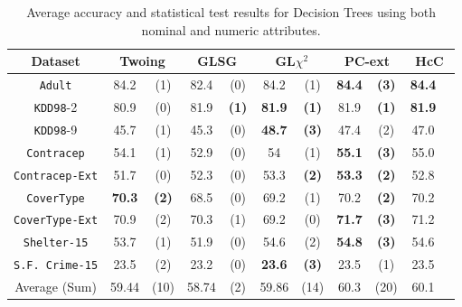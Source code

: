 \begin{table}
\small
\centering
\begin{tabular}{c|cc|cc|cc|cc|cc} 
Dataset            &\multicolumn{2}{c|}{Twoing} & \multicolumn{2}{c|}{GLSG} & \multicolumn{2}{c|}{GL$\chi^2$} & \multicolumn{2}{c|}{PC-ext}& \multicolumn{2}{c}{HcC}\\  \hline   
{\tt Adult}        & 84.2           & (1)       & 82.4       & (0)          &  84.2       & (1)               & {\bf 84.4 } & {\bf (3) }  & {\bf 84.4 } &           \\
{\tt KDD98}-2      & 80.9           & (0)       & 81.9       & {\bf (1)}    & {\bf 81.9 } & {\bf (1) }        & 81.9        & {\bf (1) }  & {\bf 81.9 } &           \\ 
{\tt KDD98}-9      & 45.7           & (1)       & 45.3       &  (0)         & {\bf 48.7 } & {\bf (3) }        &  47.4       & (2)         & 47.0        &           \\ 
{\tt Contracep}    & 54.1           & (1)       & 52.9       &  (0)         & 54          & (1)               & {\bf 55.1 } & {\bf (3) }  & 55.0        &           \\  
{\tt Contracep-Ext}& 51.7           & (0)       & 52.3       &  (0)         & 53.3        & {\bf (2) }        & {\bf 53.3 } & {\bf (2) }  & 52.8        &           \\ 
{\tt CoverType}    &  {\bf 70.3 }   & {\bf (2)} & 68.5       &  (0)         & 69.2        & (1)               &  70.2       & {\bf (2) }  & 70.2        &           \\  
{\tt CoverType-Ext}& 70.9           & (2)       & 70.3       &  (1)         & 69.2        & (0)               & {\bf 71.7 } & {\bf (3) }  & 71.2        &           \\ 
{\tt Shelter-15}   & 53.7           & (1)       & 51.9       &  (0)         & 54.6        & (2)               & {\bf 54.8 } & {\bf (3) }  & 54.6        &           \\   
{\tt S.F. Crime-15}& 23.5           & (2)       & 23.2       &  (0)         & {\bf 23.6 } & {\bf (3) }        & 23.5        & (1)         & 23.5        &           \\ 
\hline
Average (Sum)      & 59.44          & (10)      & 58.74      &  (2)         & 59.86       & (14)              & 60.3        & (20)        & 60.1        & 

\end{tabular}
\caption{Average accuracy and statistical test results for  Decision Trees using both nominal and numeric attributes.}
\label{exp:numeric-5}
\normalsize
\end{table}


